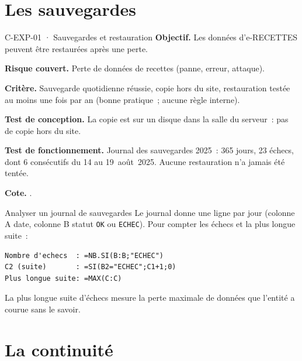 \separateur

\section{Les sauvegardes}
\label{sec:c10-sauvegardes}

\begin{boxobjet}{C-EXP-01 · Sauvegardes et restauration}
\textbf{Objectif.} Les données d'e-RECETTES peuvent être restaurées après
une perte.

\textbf{Risque couvert.} Perte de données de recettes (panne, erreur,
attaque).

\textbf{Critère.} Sauvegarde quotidienne réussie, copie hors du site,
restauration testée au moins une fois par an (bonne pratique~; aucune
règle interne).

\textbf{Test de conception.} La copie est sur un disque dans la salle du
serveur~: pas de copie hors du site.

\textbf{Test de fonctionnement.} Journal des sauvegardes 2025~: 365 jours,
23 échecs, dont 6 consécutifs du 14 au 19~août~2025. Aucune restauration
n'a jamais été tentée.

\textbf{Cote.} \NON{}.
\end{boxobjet}

\begin{boxoutils}{Analyser un journal de sauvegardes}
Le journal donne une ligne par jour (colonne A date, colonne B statut
\texttt{OK} ou \texttt{ECHEC}). Pour compter les échecs et la plus
longue suite~:
\begin{lstlisting}
Nombre d'echecs  : =NB.SI(B:B;"ECHEC")
C2 (suite)       : =SI(B2="ECHEC";C1+1;0)
Plus longue suite: =MAX(C:C)
\end{lstlisting}
La plus longue suite d'échecs mesure la perte maximale de données que
l'entité a courue sans le savoir.
\end{boxoutils}

\separateur

\section{La continuité}
\label{sec:c10-continuite}

